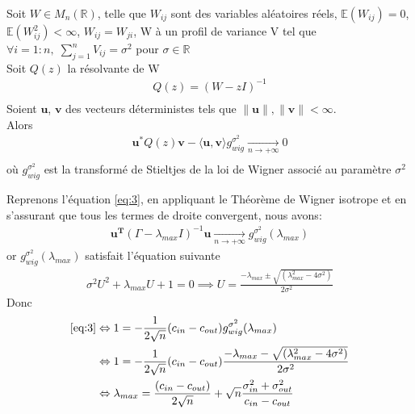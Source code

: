 \begin{theorem}\label{th:2}
Soit $W \in M_{n}(\mathbb{R})$, telle que $W_{ij}$ sont des variables aléatoires réels, $\mathbb{E}(W_{ij}) = 0$, $\mathbb{E}(W_{ij}^2) < \infty$, $W_{ij} = W_{ji}$, W à un profil de variance V tel que $\forall i = 1:n , \; \sum_{j=1}^{n}V_{ij} = \sigma^2$ pour $\sigma \in \mathbb{R}$\\
Soit $Q(z)$ la résolvante de W
\begin{align*} 
Q(z) = (W - zI)^{-1}\\
\end{align*}
Soient $\mathbf{u}$, $\mathbf{v}$ des vecteurs déterministes tels que $\|\mathbf{u}\|, \|\mathbf{v}\| < \infty$.\\
Alors 
\begin{align*} 
\mathbf{u}^*Q(z)\mathbf{v} - \langle \mathbf{u}, \mathbf{v} \rangle g_{wig}^{\sigma^2} \xrightarrow[n \to +\infty]{} 0\\
\end{align*}
où $g_{wig}^{\sigma^2}$ est la transformé de Stieltjes de la loi de Wigner associé au paramètre $\sigma^2$\\
\end{theorem}

Reprenons l’équation \eqref{eq:3}, en appliquant le Théorème de Wigner isotrope et en s'assurant que tous les termes de droite convergent, nous avons:
\begin{align*}
\mathbf{u^T}(\Gamma - \lambda_{max}I)^{-1}\mathbf{u} \xrightarrow[n \to +\infty]{} g_{wig}^{\sigma^2}(\lambda_{max})
\end{align*}
or $g_{wig}^{\sigma^2}(\lambda_{max})$ satisfait l'équation suivante 
\begin{align}
	\sigma^2U^2+\lambda_{max}U+1=0 \implies U = \frac{- \lambda_{max} \pm \sqrt{(\lambda_{max}^2 - 4\sigma^2)}}{2\sigma^2}
\end{align}
Donc
\begin{align}
	\eqref{eq:3} &\Leftrightarrow1 = -\frac{1}{2\sqrt{n}}(c_{in} - c_{out}) g_{wig}^{\sigma^2}(\lambda_{max}) \nonumber\\
	&\Leftrightarrow 1 = -\frac{1}{2\sqrt{n}}(c_{in} - c_{out}) \frac{- \lambda_{max} - \sqrt{(\lambda_{max}^2 - 4\sigma^2)}}{2\sigma^2} \nonumber\\
	&\Leftrightarrow \lambda_{max} = \frac{(c_{in} - c_{out})}{2\sqrt{n}} + \sqrt{n}\frac{\sigma_{in}^2 + \sigma_{out}^2}{c_{in} - c_{out}} \label{z_1}
\end{align}

